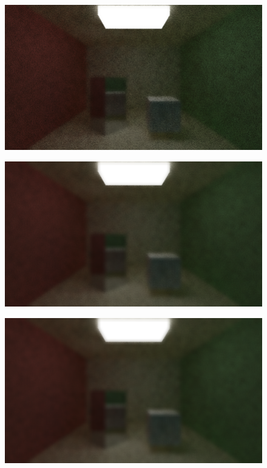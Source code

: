 \documentclass[titlepage,12pt]{report}
\begin{document}
\begin{appendices}
\begin{figure}[H]
	\centering
	\includegraphics[scale=0.5]{media/bilateral/cornell_normal_10_bilateral_filter_21_10_20.png}
	\label{ap22}
\end{figure}

\begin{figure}[H]
	\centering
	\includegraphics[scale=0.5]{media/bilateral/cornell_normal_10_bilateral_filter_21_10_40.png}
	\label{ap23}
\end{figure}

\begin{figure}[H]
	\centering
	\includegraphics[scale=0.5]{media/bilateral/cornell_normal_10_bilateral_filter_21_10_60.png}
	\label{ap24}
\end{figure}


\end{appendices}
\end{document}

